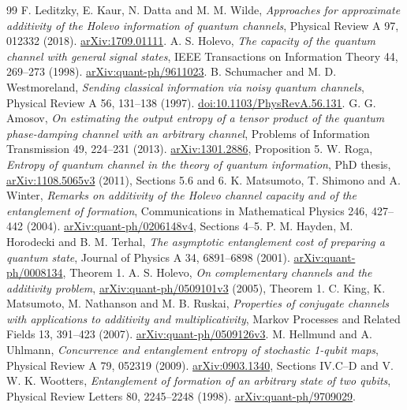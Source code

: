 \documentclass[11pt]{article}
\begin{document}
\begin{thebibliography}{99}
 F. Leditzky, E. Kaur, N. Datta and M. M. Wilde, \emph{Approaches for approximate additivity of the Holevo information of quantum channels}, Physical Review A 97, 012332 (2018). \href{https://arxiv.org/abs/1709.01111}{arXiv:1709.01111}.
 A. S. Holevo, \emph{The capacity of the quantum channel with general signal states}, IEEE Transactions on Information Theory 44, 269--273 (1998). \href{https://arxiv.org/abs/quant-ph/9611023}{arXiv:quant-ph/9611023}.
 B. Schumacher and M. D. Westmoreland, \emph{Sending classical information via noisy quantum channels}, Physical Review A 56, 131--138 (1997). \href{https://doi.org/10.1103/PhysRevA.56.131}{doi:10.1103/PhysRevA.56.131}.
 G. G. Amosov, \emph{On estimating the output entropy of a tensor product of the quantum phase-damping channel with an arbitrary channel}, Problems of Information Transmission 49, 224--231 (2013). \href{https://arxiv.org/abs/1301.2886}{arXiv:1301.2886}, Proposition 5.
 W. Roga, \emph{Entropy of quantum channel in the theory of quantum information}, PhD thesis, \href{https://arxiv.org/abs/1108.5065v3}{arXiv:1108.5065v3} (2011), Sections 5.6 and 6.
 K. Matsumoto, T. Shimono and A. Winter, \emph{Remarks on additivity of the Holevo channel capacity and of the entanglement of formation}, Communications in Mathematical Physics 246, 427--442 (2004). \href{https://arxiv.org/abs/quant-ph/0206148}{arXiv:quant-ph/0206148v4}, Sections 4--5.
 P. M. Hayden, M. Horodecki and B. M. Terhal, \emph{The asymptotic entanglement cost of preparing a quantum state}, Journal of Physics A 34, 6891--6898 (2001). \href{https://arxiv.org/abs/quant-ph/0008134}{arXiv:quant-ph/0008134}, Theorem 1.
 A. S. Holevo, \emph{On complementary channels and the additivity problem}, \href{https://arxiv.org/abs/quant-ph/0509101v3}{arXiv:quant-ph/0509101v3} (2005), Theorem 1.
 C. King, K. Matsumoto, M. Nathanson and M. B. Ruskai, \emph{Properties of conjugate channels with applications to additivity and multiplicativity}, Markov Processes and Related Fields 13, 391--423 (2007). \href{https://arxiv.org/abs/quant-ph/0509126v3}{arXiv:quant-ph/0509126v3}.
 M. Hellmund and A. Uhlmann, \emph{Concurrence and entanglement entropy of stochastic 1-qubit maps}, Physical Review A 79, 052319 (2009). \href{https://arxiv.org/abs/0903.1340}{arXiv:0903.1340}, Sections IV.C--D and V.
 W. K. Wootters, \emph{Entanglement of formation of an arbitrary state of two qubits}, Physical Review Letters 80, 2245--2248 (1998). \href{https://arxiv.org/abs/quant-ph/9709029}{arXiv:quant-ph/9709029}.

\end{thebibliography}
\end{document}
